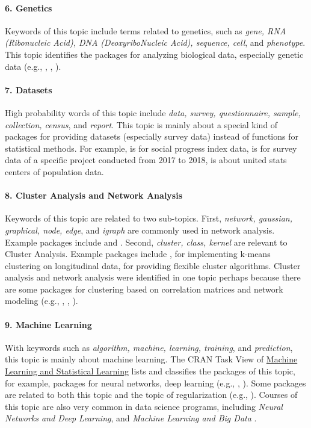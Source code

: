 \paragraph{6. Genetics} Keywords of this topic include terms related to genetics, such as {\it gene, RNA (Ribonucleic Acid), DNA (DeoxyriboNucleic Acid), sequence, cell}, and {\it phenotype}. This topic identifies the packages for analyzing biological data, especially genetic data (e.g., , , ). 

\paragraph{7. Datasets} High probability words of this topic include {\it data, survey, questionnaire, sample, collection, census}, and {\it report}. This topic is mainly about a special kind of packages for providing datasets (especially survey data) instead of functions for statistical methods. For example,  is for social progress index data,  is for survey data of a specific project conducted from 2017 to 2018,  is about united stats centers of population data. 

\paragraph{8. Cluster Analysis and Network Analysis} Keywords of this topic are related to two sub-topics. First, {\it network, gaussian, graphical, node, edge}, and {\it igraph} are commonly used in network analysis. Example packages include  and . Second, {\it cluster, class, kernel} are relevant to Cluster Analysis. Example packages include ,  for implementing k-means clustering on longitudinal data,  for providing flexible cluster algorithms. Cluster analysis and network analysis were identified in one topic perhaps because there are some packages for clustering based on correlation matrices and network modeling (e.g., , , ).




\paragraph{9. Machine Learning} With keywords such as {\it algorithm, machine, learning, training}, and {\it prediction}, this topic is mainly about machine learning. The CRAN Task View of \href{https://cran.r-project.org/web/views/MachineLearning.html}{Machine Learning and Statistical Learning} lists and classifies the packages of this topic, for example, packages for neural networks, deep learning (e.g., , ).  Some packages are related to both this topic and the topic of regularization (e.g., ). Courses of this topic are also very common in data science programs, including {\it Neural Networks and Deep Learning}, and {\it Machine Learning and Big Data} \citep{zhang2021data}.

